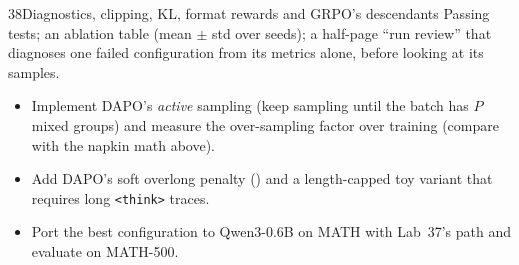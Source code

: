 \begin{labbox}{38}{Diagnostics, clipping, KL, format rewards and GRPO's descendants}
Passing tests; an ablation table (mean $\pm$ std over seeds); a half-page ``run review'' that
diagnoses one failed configuration from its metrics alone, before looking at its samples.

\begin{itemize}
\item Implement DAPO's \emph{active} sampling (keep sampling until the batch has $P$ mixed groups)
and measure the over-sampling factor over training (compare with the napkin math above).
\item Add DAPO's soft overlong penalty () and a
length-capped toy variant that requires long \verb|<think>| traces.
\item Port the best configuration to Qwen3-0.6B on MATH with Lab~37's 
path and evaluate on MATH-500.
\end{itemize}
\end{labbox}
